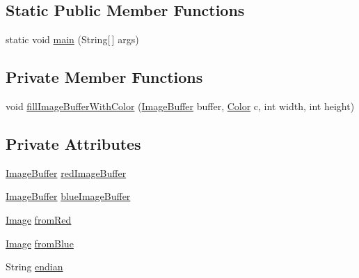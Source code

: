 \subsection*{Static Public Member Functions}
\begin{DoxyCompactItemize}
\item 
static void \mbox{\hyperlink{classorg_1_1newdawn_1_1slick_1_1tests_1_1_image_buffer_endian_test_a1e6438bfe366a8fac4f6fc92b64d2ad4}{main}} (String\mbox{[}$\,$\mbox{]} args)
\end{DoxyCompactItemize}
\subsection*{Private Member Functions}
\begin{DoxyCompactItemize}
\item 
void \mbox{\hyperlink{classorg_1_1newdawn_1_1slick_1_1tests_1_1_image_buffer_endian_test_affc20891175170b7561882e269c1d2f8}{fill\+Image\+Buffer\+With\+Color}} (\mbox{\hyperlink{classorg_1_1newdawn_1_1slick_1_1_image_buffer}{Image\+Buffer}} buffer, \mbox{\hyperlink{classorg_1_1newdawn_1_1slick_1_1_color}{Color}} c, int width, int height)
\end{DoxyCompactItemize}
\subsection*{Private Attributes}
\begin{DoxyCompactItemize}
\item 
\mbox{\hyperlink{classorg_1_1newdawn_1_1slick_1_1_image_buffer}{Image\+Buffer}} \mbox{\hyperlink{classorg_1_1newdawn_1_1slick_1_1tests_1_1_image_buffer_endian_test_adbbe4334a2dee6922360201cfb828378}{red\+Image\+Buffer}}
\item 
\mbox{\hyperlink{classorg_1_1newdawn_1_1slick_1_1_image_buffer}{Image\+Buffer}} \mbox{\hyperlink{classorg_1_1newdawn_1_1slick_1_1tests_1_1_image_buffer_endian_test_a95e149b94cd6767208482dceb9a314e0}{blue\+Image\+Buffer}}
\item 
\mbox{\hyperlink{classorg_1_1newdawn_1_1slick_1_1_image}{Image}} \mbox{\hyperlink{classorg_1_1newdawn_1_1slick_1_1tests_1_1_image_buffer_endian_test_afa7ce0c44b9c2f07b05701c00d3abcb5}{from\+Red}}
\item 
\mbox{\hyperlink{classorg_1_1newdawn_1_1slick_1_1_image}{Image}} \mbox{\hyperlink{classorg_1_1newdawn_1_1slick_1_1tests_1_1_image_buffer_endian_test_ab1272c261f070e21da306eb13d42eb9c}{from\+Blue}}
\item 
String \mbox{\hyperlink{classorg_1_1newdawn_1_1slick_1_1tests_1_1_image_buffer_endian_test_a58c2c0023847f45f85d2b8cb35fea441}{endian}}
\end{DoxyCompactItemize}
